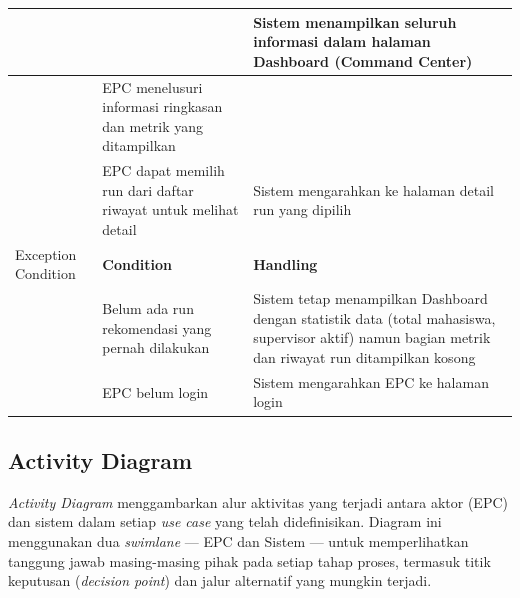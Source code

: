 \begin{longtable}{|p{3.5cm}|p{4.5cm}|p{5cm}|}
\hline
 & & Sistem menampilkan seluruh informasi dalam halaman Dashboard (Command Center) \\
\hline
 & EPC menelusuri informasi ringkasan dan metrik yang ditampilkan & \\
\hline
 & EPC dapat memilih run dari daftar riwayat untuk melihat detail & Sistem mengarahkan ke halaman detail run yang dipilih \\
\hline
Exception Condition & \textbf{Condition} & \textbf{Handling} \\
\hline
 & Belum ada run rekomendasi yang pernah dilakukan & Sistem tetap menampilkan Dashboard dengan statistik data (total mahasiswa, supervisor aktif) namun bagian metrik dan riwayat run ditampilkan kosong \\
\hline
 & EPC belum login & Sistem mengarahkan EPC ke halaman login \\
\hline
\end{longtable}

\clearpage
\subsection{Activity Diagram}\label{activity-diagram}

\textit{Activity Diagram} menggambarkan alur aktivitas yang terjadi antara aktor (EPC) dan sistem dalam setiap \textit{use case} yang telah didefinisikan. Diagram ini menggunakan dua \textit{swimlane} — EPC dan Sistem — untuk memperlihatkan tanggung jawab masing-masing pihak pada setiap tahap proses, termasuk titik keputusan (\textit{decision point}) dan jalur alternatif yang mungkin terjadi.

